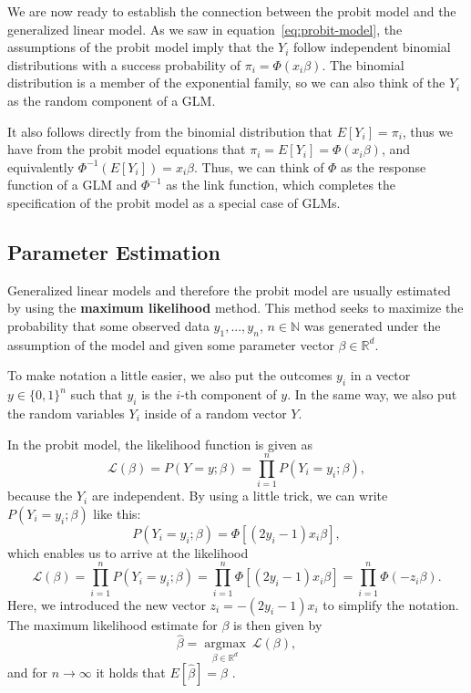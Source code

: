 We are now ready to establish the connection between the probit model and
the generalized linear model.
As we saw in equation~\ref{eq:probit-model}, the assumptions of the
probit model imply that the $Y_i$ follow independent binomial distributions
with a success probability of $\pi_i = \Phi(x_i \beta)$.
The binomial distribution is a member of the exponential family, so
we can also think of the $Y_i$ as the random component of a GLM.

It also follows directly from the binomial distribution that
$E[Y_i] = \pi_i$, thus we have from the probit model equations that
$\pi_i = E[Y_i] = \Phi(x_i \beta)$, and equivalently
$\Phi^{-1}(E[Y_i]) = x_i \beta$. Thus, we can think of $\Phi$ as the response
function of a GLM and $\Phi^{-1}$ as the link function, which completes
the specification of the probit model as a special case of GLMs.

\subsection{Parameter Estimation}
\label{sec:parameter-estimation}

Generalized linear models and therefore the probit model are usually
estimated by using the \textbf{maximum likelihood} method.
This method seeks to maximize the probability that some observed
data $y_1, ..., y_n$, $n \in \mathbb{N}$ was generated under the
assumption of the model and given some parameter vector
$\beta \in \mathbb{R}^d$.

To make notation a little easier, we also put the outcomes $y_i$
in a vector $y \in \{0, 1\}^n$ such that $y_i$ is the $i$-th
component of $y$. In the same way, we also put the random
variables $Y_i$ inside of a random vector $Y$.

In the probit model, the likelihood function is given as
\begin{equation}
    \label{eq:likelihood}
    \mathcal{L}(\beta) = P(Y=y ; \beta) = \prod_{i=1}^n P(Y_i=y_i ; \beta),
\end{equation}
because the $Y_i$ are independent. By using a little trick, we can
write $P(Y_i=y_i;\beta)$ like this:
\begin{equation*}
    P(Y_i = y_i ; \beta) = \Phi[(2y_i - 1) x_i \beta],
\end{equation*}
which enables us to arrive at the likelihood
\begin{equation}
    \mathcal{L}(\beta) = \prod_{i=1}^n P(Y_i=y_i ; \beta)
    = \prod_{i=1}^n \Phi[(2y_i - 1) x_i \beta]
    = \prod_{i=1}^n \Phi(- z_i \beta).
\end{equation}
Here, we introduced the new vector $z_i = - (2y_i - 1) x_i$ to simplify
the notation.
The maximum likelihood estimate for $\beta$ is then given by
\begin{equation}
    \label{eq:maximum-likelihood-estimate}
    \hat{\beta} = \underset{\beta \in \mathbb{R}^d}{\operatorname{argmax}}\
    \mathcal{L}(\beta),
\end{equation}
and for $n \rightarrow \infty$ it holds that
$E[\hat{\beta}] = \beta$ \cite{regression-fahrmeir}.

